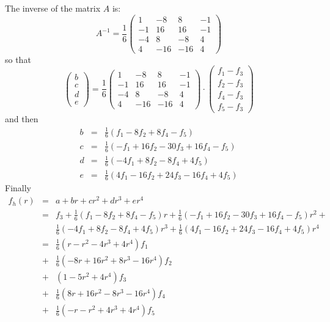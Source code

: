 The inverse of the matrix $A$ is:
\[
A^{-1}=
\frac{1}{6}
\left(
\begin{array}{ccccc}
1 & -8 & 8 & -1 \\
-1 & 16 & 16 & -1 \\
-4 & 8 & -8 & 4 \\
4 & -16 & -16 & 4
\end{array}
\right)
\]
so that 
\[
\left(
\begin{array}{c}
b \\ c \\ d \\ e
\end{array}
\right)
=
\frac{1}{6}
\left(
\begin{array}{ccccc}
1 & -8 & 8 & -1 \\
-1 & 16 & 16 & -1 \\
-4 & 8 & -8 & 4 \\
4 & -16 & -16 & 4
\end{array}
\right)
\cdot
\left(
\begin{array}{c}
f_1 -f_3 \\ f_2 -f_3\\ f_4-f_3 \\ f_5 -f_3
\end{array}
\right)
\]
and then 
\begin{eqnarray}
b &=& \frac{1}{6} \left( f_1 -8f_2 +8 f_4 -f_5     \right) \\
c &=& \frac{1}{6} \left( -f_1 +16f_2 -30f_3    + 16f_4- f_5   \right) \\
d &=& \frac{1}{6} \left( -4f_1 +8f_2     -8f_4+ 4 f_5   \right) \\
e &=& \frac{1}{6} \left( 4f_1 -16f_2 +24f_3 -16f_4+ 4 f_5   \right) 
\end{eqnarray}
Finally
\begin{eqnarray}
f_h(r) 
&=& a+br+cr^2+dr^3+er^4 \\
&=& f_3 + 
\frac{1}{6} \left( f_1 -8f_2 +8 f_4 -f_5     \right)  r  +
\frac{1}{6} \left( -f_1 +16f_2 -30f_3    + 16f_4- f_5   \right) r^2 +\\ &&
\frac{1}{6} \left( -4f_1 +8f_2     -8f_4+ 4 f_5   \right) r^3 +
\frac{1}{6} \left( 4f_1 -16f_2 +24f_3 -16f_4+ 4 f_5   \right) r^4 \\
&=& \frac{1}{6} \left(  r- r^2 -4r^3 +4r^4\right) f_1 \\
&+& \frac{1}{6} \left(  -8r+16 r^2 +8r^3 -16 r^4\right) f_2 \\
&+& \left( 1 -5r^2+4r^4  \right) f_3 \\
&+& \frac{1}{6} \left(  8r+16 r^2 -8r^3 -16 r^4\right) f_4 \\
&+& \frac{1}{6} \left(  -r- r^2 +4r^3 +4r^4\right) f_5
\end{eqnarray}
